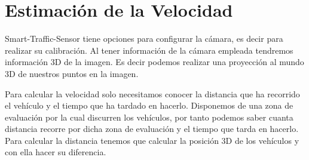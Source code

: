 \section{Estimación de la Velocidad}

Smart-Traffic-Sensor tiene opciones para configurar la cámara, es decir para realizar su calibración. Al tener información de la cámara empleada tendremos información 3D de la imagen. Es decir podemos realizar una proyección al mundo 3D de nuestros puntos en la imagen.

Para calcular la velocidad solo necesitamos conocer la distancia que ha recorrido el vehículo y el tiempo que ha tardado en hacerlo. Disponemos de una zona de evaluación por la cual discurren los vehículos, por tanto podemos saber cuanta distancia recorre por dicha zona de evaluación y el tiempo que tarda en hacerlo. Para calcular la distancia tenemos que calcular la posición 3D de los vehículos y con ella hacer su diferencia.


